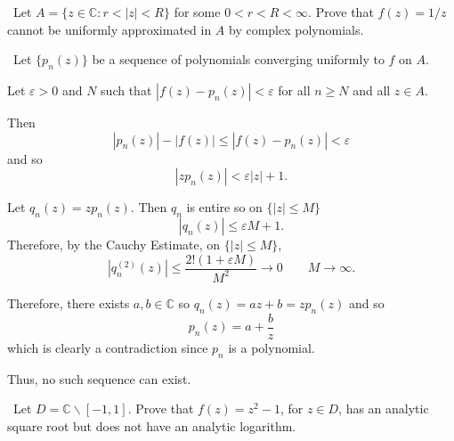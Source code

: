 \documentclass[12pt]{Homework}
\begin{document}
\begin{problem} $\,$
Let $A=\{z\in\mathbb{C}:r<|z|<R\}$ for some $0<r<R<\infty.$ Prove that $f(z)=1/z$ cannot be uniformly approximated in $A$ by complex polynomials.
\end{problem}


\begin{solution}$\,$
Let $\{p_n(z)\}$ be a sequence of polynomials converging uniformly to $f$ on $A$.

Let $\varepsilon>0$ and $N$ such that $|f(z)-p_n(z)|<\varepsilon$ for all $n\ge N$ and all $z\in A$.

Then $$|p_n(z)|-|f(z)|\le|f(z)-p_n(z)|<\varepsilon$$ and so $$|zp_n(z)|<\varepsilon|z|+1.$$

Let $q_n(z)=zp_n(z)$. Then $q_n$ is entire so on $\{|z|\le M\}$ $$|q_n(z)|\le \varepsilon M+1.$$ Therefore, by the Cauchy Estimate, on $\{|z|\le M\}$, $$|q_n^{(2)}(z)|\le\frac{2!(1+\varepsilon M)}{M^2}\to0\qquad M\to\infty.$$

Therefore, there exists $a,b\in\mathbb{C}$ so $q_n(z)=az+b=zp_n(z)$ and so $$p_n(z)=a+\frac{b}{z}$$ which is clearly a contradiction since $p_n$ is a polynomial.

Thus, no such sequence can exist.
\end{solution}
\newpage



\begin{problem} $\,$
Let $D=\mathbb{C}\backslash[-1,1]$. Prove that $f(z)=z^2-1$, for $z\in D$, has an analytic square root but does not have an analytic logarithm. 
\end{problem}
\end{document}
